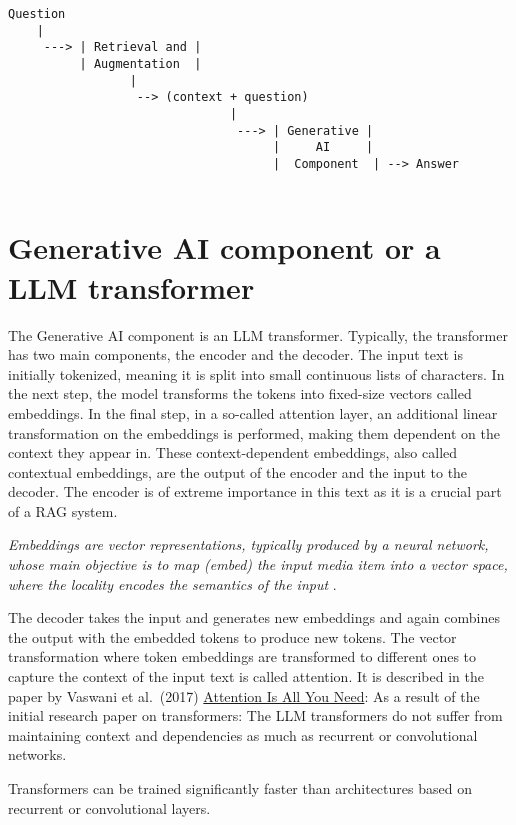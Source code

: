 \documentclass{wseas}
\begin{document}
\begin{verbatim}
Question  
    |
     ---> | Retrieval and | 
          | Augmentation  |
                 |
                  --> (context + question)
                               |
                                ---> | Generative |
                                     |     AI     |
                                     |  Component  | --> Answer             
              
\end{verbatim}


\section{Generative AI component or a LLM
transformer}

The Generative AI component is an LLM transformer. Typically, the
transformer has two main components, the encoder and the decoder. The
input text is initially tokenized, meaning it is split into small
continuous lists of characters. In the next step, the model transforms
the tokens into fixed-size vectors called embeddings. In the final step,
in a so-called attention layer, an additional linear transformation on
the embeddings is performed, making them dependent on the context they
appear in. These context-dependent embeddings, also called contextual
embeddings, are the output of the encoder and the input to the decoder.
The encoder is of extreme importance in this text as it is a crucial
part of a RAG system.

\emph{Embeddings are vector representations, typically produced by a
neural network, whose main objective is to map (embed) the input media
item into a vector space, where the locality encodes the semantics of
the input} \cite{cite2}.

The decoder takes the input and generates new embeddings and again
combines the output with the embedded tokens to produce new tokens. The
vector transformation where token embeddings are transformed to
different ones to capture the context of the input text is called
attention. It is described in the paper by Vaswani et al.~(2017)
\href{https://arxiv.org/pdf/1706.03762}{Attention Is All You Need}: As a
result of the initial research paper on transformers: The LLM
transformers do not suffer from maintaining context and dependencies as
much as recurrent or convolutional networks.

Transformers can be trained significantly faster than architectures
based on recurrent or convolutional layers.
\end{document}
